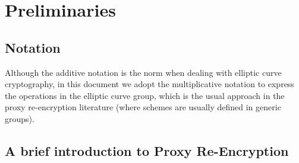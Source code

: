 \documentclass{amsart}
\begin{document}
%
%

\section{Preliminaries}

\subsection{Notation}

Although the additive notation is the norm when dealing with elliptic curve cryptography, in this document we adopt the multiplicative notation to express the operations in the elliptic curve group, which is the usual approach in the proxy re-encryption literature (where schemes are usually defined in generic groups).

\subsection{A brief introduction to Proxy Re-Encryption}
\end{document}
